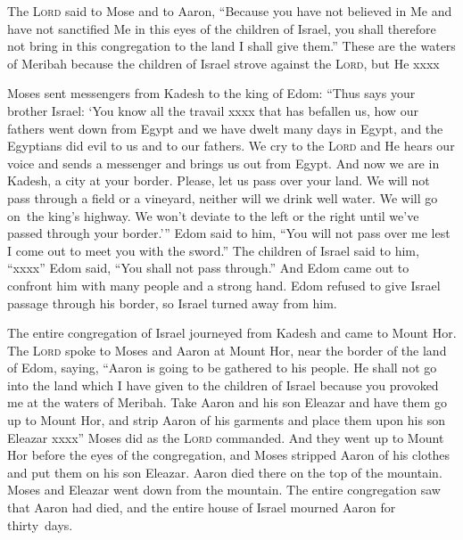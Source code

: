 \begin{inparaenum}
   The \textsc{Lord} said to Mose and to Aaron, ``Because you have not believed in Me and have not sanctified Me in this eyes of the children of Israel, you shall therefore not bring in this congregation to the land I shall give them.''%
   These are the waters of Meribah because the children of Israel strove against the \textsc{Lord}, but He xxxx%
  
   Moses sent messengers from Kadesh to the king of Edom: ``Thus says your brother Israel: `You know all the travail xxxx that has befallen us,%
   how our fathers went down from Egypt and we have dwelt many days in Egypt, and the Egyptians did evil to us and to our fathers.%
   We cry to the \textsc{Lord} and He hears our voice and sends a messenger and brings us out from Egypt. And now we are in Kadesh, a city at your border.%
   Please, let us pass over your land. We will not pass through a field or a vineyard, neither will we drink well water. We will go on\understood\ the king's highway. We won't deviate to the left or the right until we've passed through your border.'\thinspace''%
   Edom said to him, ``You will not pass over me lest I come out to meet you with the sword.''%
   The children of Israel said to him, ``xxxx''%
   Edom said, ``You shall not pass through.'' And Edom came out to confront him with many people and a strong hand.%
   Edom refused to give Israel passage through his border, so Israel turned away from him.%
  
   The entire congregation of Israel journeyed from Kadesh and came to Mount Hor.%
   The \textsc{Lord} spoke to Moses and Aaron at Mount Hor, near the border of the land of Edom, saying,%
   ``Aaron is going to be gathered to his people. He shall not go into the land which I have given to the children of Israel because you provoked me at the waters of Meribah.%
   Take Aaron and his son Eleazar and have them go up to Mount Hor,%
   and strip Aaron of his garments and place them upon his son Eleazar xxxx''%
   Moses did as the \textsc{Lord} commanded. And they went up to Mount Hor before the eyes of the congregation,%
   and Moses stripped Aaron of his clothes and put them on his son Eleazar. Aaron died there on the top of the mountain. Moses and Eleazar went down from the mountain.%
   The entire congregation saw that Aaron had died, and the entire house of Israel mourned Aaron for thirty~days.%
\end{inparaenum}
